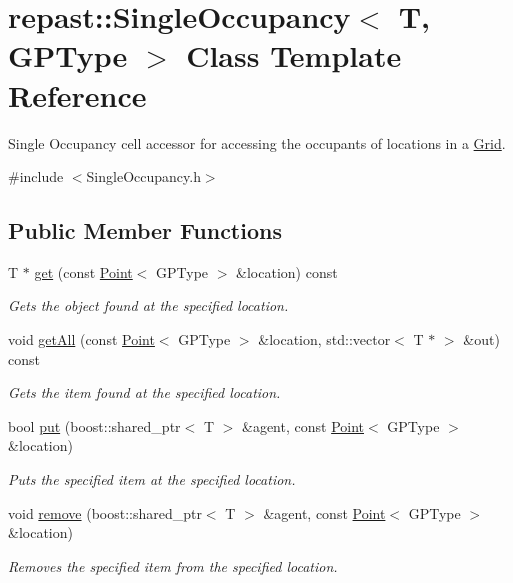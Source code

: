 \hypertarget{classrepast_1_1_single_occupancy}{\section{repast\-:\-:Single\-Occupancy$<$ T, G\-P\-Type $>$ Class Template Reference}
\label{classrepast_1_1_single_occupancy}
}


Single Occupancy cell accessor for accessing the occupants of locations in a \hyperlink{classrepast_1_1_grid}{Grid}.  




{\ttfamily \#include $<$Single\-Occupancy.\-h$>$}

\subsection*{Public Member Functions}
\begin{DoxyCompactItemize}
\item 
T $\ast$ \hyperlink{classrepast_1_1_single_occupancy_a0793bcf66d06870aaf124a4973e7af8d}{get} (const \hyperlink{classrepast_1_1_point}{Point}$<$ G\-P\-Type $>$ \&location) const 
\begin{DoxyCompactList}\small\item\em Gets the object found at the specified location. \end{DoxyCompactList}\item 
void \hyperlink{classrepast_1_1_single_occupancy_a85ca94b006194f1dda1ab2b6a0906bf1}{get\-All} (const \hyperlink{classrepast_1_1_point}{Point}$<$ G\-P\-Type $>$ \&location, std\-::vector$<$ T $\ast$ $>$ \&out) const 
\begin{DoxyCompactList}\small\item\em Gets the item found at the specified location. \end{DoxyCompactList}\item 
bool \hyperlink{classrepast_1_1_single_occupancy_aaa697304c7a2ad36799bdd4d9e42e57c}{put} (boost\-::shared\-\_\-ptr$<$ T $>$ \&agent, const \hyperlink{classrepast_1_1_point}{Point}$<$ G\-P\-Type $>$ \&location)
\begin{DoxyCompactList}\small\item\em Puts the specified item at the specified location. \end{DoxyCompactList}\item 
void \hyperlink{classrepast_1_1_single_occupancy_ab2f366205ad7783cc4537c9e16369043}{remove} (boost\-::shared\-\_\-ptr$<$ T $>$ \&agent, const \hyperlink{classrepast_1_1_point}{Point}$<$ G\-P\-Type $>$ \&location)
\begin{DoxyCompactList}\small\item\em Removes the specified item from the specified location. \end{DoxyCompactList}\end{DoxyCompactItemize}


